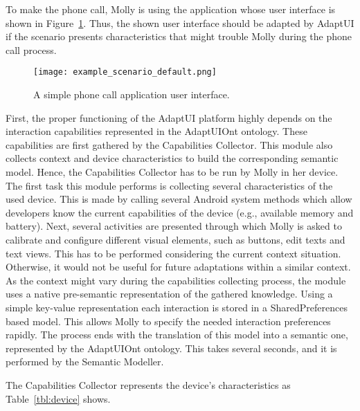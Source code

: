 
To make the phone call, Molly is using the application whose user interface is
shown in Figure~\ref{fig:example_scenario_default}. Thus, the shown user interface
should be adapted by AdaptUI if the scenario presents characteristics that might
trouble Molly during the phone call process.

\begin{figure}[H]
\centering
\texttt{[image: example\_scenario\_default.png]}
\caption{A simple phone call application user interface.}
\label{fig:example_scenario_default}
\end{figure}

First, the proper functioning of the AdaptUI platform highly depends on the
interaction capabilities represented in the AdaptUIOnt ontology. These capabilities
are first gathered by the Capabilities Collector. This module also collects context
and device characteristics to build the corresponding semantic model. Hence,
the Capabilities Collector has to be run by Molly in her device. The first task
this module performs is collecting several characteristics of the used device.
This is made by calling several Android system methods which allow developers
know the current capabilities of the device (e.g., available memory and battery).
Next, several activities are presented through which Molly is asked to calibrate
and configure different visual elements, such as buttons, edit texts and text
views. This has to be performed considering the current context situation. 
Otherwise, it would not be useful for future adaptations within a similar context. 
As the context might vary during the capabilities collecting process, the module
uses a native pre-semantic representation of the gathered knowledge. Using a simple
key-value representation each interaction is stored in a SharedPreferences based
model. This allows Molly to specify the needed interaction preferences rapidly.
The process ends with the translation of this model into a semantic one, represented
by the AdaptUIOnt ontology. This takes several seconds, and it is performed by
the Semantic Modeller. 

The Capabilities Collector represents the device's characteristics as Table~\ref{tbl:device}
shows.

